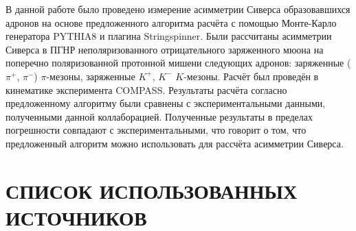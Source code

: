 \documentclass{extreport}
\begin{document}
В данной работе было проведено измерение асимметрии Сиверса образовавшихся адронов на основе предложенного алгоритма расчёта с помощью Монте-Карло генератора PYTHIA8 и плагина Stringspinner.  Были рассчитаны асимметрии Сиверса в ПГНР неполяризованного отрицательного заряженного мюона на поперечно поляризованной протонной мишени следующих адронов: заряженные ($\pi^{+}$, $\pi^{-}$) $\pi$-мезоны, заряженные $K^{+}$, $K^{-}$ $K$-мезоны. Расчёт был проведён в кинематике эксперимента COMPASS. Результаты расчёта согласно предложенному алгоритму были сравнены с экспериментальными данными, полученными данной коллаборацией. Полученные результаты в пределах погрешности совпадают с экспериментальными, что говорит о том, что предложенный алгоритм можно использовать для рассчёта асимметрии Сиверса.
\newpage
\chapter*{\MakeUppercase{Список использованных источников}}

\thispagestyle{headings}
\printbibliography[heading=none]
\end{document}
